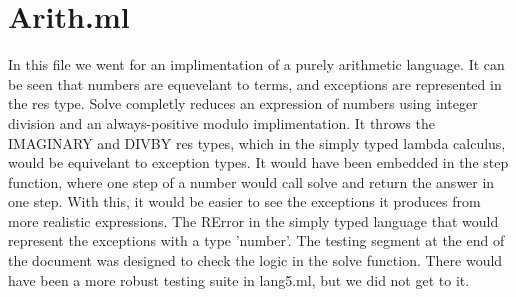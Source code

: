 \documentclass{article}
\begin{document}
\section*{Arith.ml}
In this file we went for an implimentation of a purely arithmetic language. It can be seen that numbers are equevelant to terms, and exceptions are represented in the res type. Solve completly reduces an expression of numbers using integer division and an always-positive modulo implimentation. It throws the IMAGINARY and DIV\textunderscore BY res types, which in the simply typed lambda calculus, would be equivelant to exception types. It would have been embedded in the step function, where one step of a number would call solve and return the answer in one step. With this, it would be easier to see the exceptions it produces from more realistic expressions. The RError in the simply typed language that would represent the exceptions with a type 'number'. The testing segment at the end of the document was designed to check the logic in the solve function. There would have been a more robust testing suite in lang5.ml, but we did not get to it. 
\end{document}
